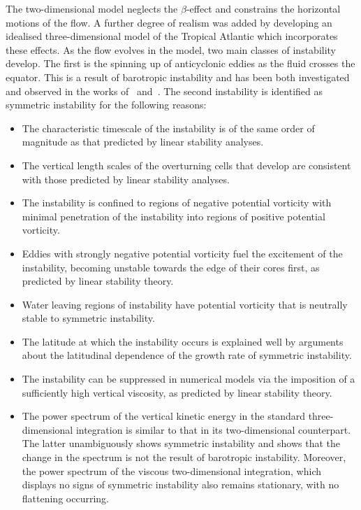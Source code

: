 The two-dimensional model neglects the $\beta$-effect and constrains the horizontal motions of the flow. A further degree of realism was added by developing an idealised three-dimensional model of the Tropical Atlantic which incorporates these effects. As the flow evolves in the model, two main classes of instability develop. The first is the spinning up of anticyclonic eddies as the fluid crosses the equator. This is a result of barotropic instability and has been both investigated and observed in the works of~\citet{Edwards1998I, Edwards1998II} and~\citet{Goes2009}. The second instability is identified as symmetric instability for the following reasons:
\begin{itemize}
    \item The characteristic timescale of the instability is of the same order of magnitude as that predicted by linear stability analyses.
    \item The vertical length scales of the overturning cells that develop are consistent with those predicted by linear stability analyses.
    \item The instability is confined to regions of negative potential vorticity with minimal penetration of the instability into regions of positive potential vorticity.
    \item Eddies with strongly negative potential vorticity fuel the excitement of the instability, becoming unstable towards the edge of their cores first, as predicted by linear stability theory.
    \item Water leaving regions of instability have potential vorticity that is neutrally stable to symmetric instability.
    \item The latitude at which the instability occurs is explained well by arguments about the latitudinal dependence of the growth rate of symmetric instability.
    \item The instability can be suppressed in numerical models via the imposition of a sufficiently high vertical viscosity, as predicted by linear stability theory.
    \item The power spectrum of the vertical kinetic energy in the standard three-dimensional integration is similar to that in its two-dimensional counterpart. The latter unambiguously shows symmetric instability and shows that the change in the spectrum is not the result of barotropic instability. Moreover, the power spectrum of the viscous two-dimensional integration, which displays no signs of symmetric instability also remains stationary, with no flattening occurring.
\end{itemize}

